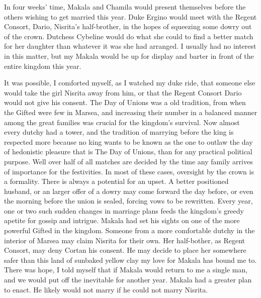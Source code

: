 \documentclass{article}
\begin{document}
In four weeks' time, Makala and Chamila would present themselves before the others wishing to get married this year. Duke Ergino would meet with the Regent Consort, Dario, Nisrita's half-brother, in the hopes of squeezing some dowry out of the crown. Dutchess Cybeline would do what she could to find a better match for her daughter than whatever it was she had arranged. I usually had no interest in this matter, but my Makala would be up for display and barter in front of the entire kingdom this year.

It was possible, I comforted myself, as I watched my duke ride, that someone else would take the girl Nisrita away from him, or that the Regent Consort Dario would not give his consent. The Day of Unions was a old tradition, from when the Gifted were few in Marsea, and increasing their number in a balanced manner among the great families was crucial for the kingdom's survival. Now almost every dutchy had a tower, and the tradition of marrying before the king is respected more because no king wants to be known as the one to outlaw the day of hedonistic pleasure that is The Day of Unions, than for any practical political purpose. Well over half of all matches are decided by the time any family arrives of importance for the festivities. In most of these cases, oversight by the crown is a formality. There is always a potential for an upset. A better positioned husband, or an larger offer of a dowry may come forward the day before, or even the morning before the union is sealed, forcing vows to be rewritten. Every year, one or two such sudden changes in marriage plans feeds the kingdom's greedy apetite for gossip and intrigue. Makala had set his sights on one of the more powerful Gifted in the kingdom. Someone from a more comfortable dutchy in the interior of Marsea may claim Nisrita for their own. Her half-bother, as Regent Consort, may deny Cortan his consent. He may decide to place her somewhere safer than this land of sunbaked yellow clay my love for Makala has bound me to.  There was hope, I told myself that if Makala would return to me a single man, and we would put off the inevitable for another year. Makala had a greater plan to enact. He likely would not marry if he could not marry Nisrita.

\begin{comment} He had asked me, the night before he left, to marry in the local ceremonies. I would have thought a different man to be mad for making such a request. My duke was scheming. He would not tell me his plans, though it was clear that he would not marry if he could not marry Nisrita. If I had not stayed away from him during the last days of his life as a single man, I could have wheedled his plans from him. As I had stayed away, I let my duke leave without promising to follow his wishes. I would leave, I had decided, if Makala returned a married man. If, by some miracle or the Preserver's mercy, he returned to me single, I would stay with Duke Ergino another year. The miscast third son of a house barren of the gift did not need to marry.\end{comment}
\end{document}
